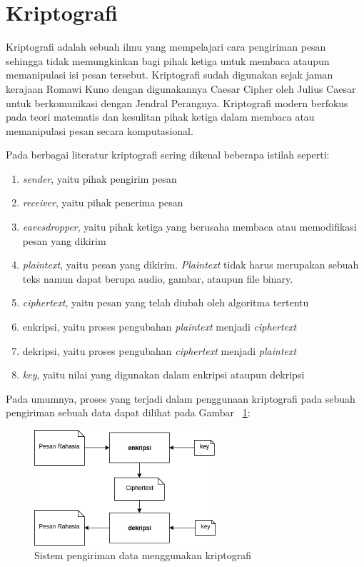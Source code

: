 \section{Kriptografi}
  Kriptografi adalah sebuah ilmu yang mempelajari cara pengiriman pesan sehingga tidak memungkinkan bagi pihak ketiga untuk membaca ataupun memanipulasi isi pesan tersebut. Kriptografi sudah digunakan sejak jaman kerajaan Romawi Kuno dengan digunakannya Caesar Cipher oleh Julius Caesar untuk berkomunikasi dengan Jendral Perangnya. Kriptografi modern berfokus pada teori matematis dan kesulitan pihak ketiga dalam membaca atau memanipulasi pesan secara komputasional.

  Pada berbagai literatur kriptografi sering dikenal beberapa istilah seperti:
  \begin{enumerate}[label=\roman*.]
    \item \textit{sender}, yaitu pihak pengirim pesan
    \item \textit{receiver}, yaitu pihak penerima pesan
    \item \textit{eavesdropper}, yaitu pihak ketiga yang berusaha membaca atau memodifikasi pesan yang dikirim
    \item \textit{plaintext}, yaitu pesan yang dikirim. \textit{Plaintext} tidak harus merupakan sebuah teks namun dapat berupa audio, gambar, ataupun file binary.
    \item \textit{ciphertext}, yaitu pesan yang telah diubah oleh algoritma tertentu
    \item enkripsi, yaitu proses pengubahan \textit{plaintext} menjadi \textit{ciphertext}
    \item dekripsi, yaitu proses pengubahan \textit{ciphertext} menjadi \textit{plaintext}
    \item \textit{key}, yaitu nilai yang digunakan dalam enkripsi ataupun dekripsi
  \end{enumerate}

  Pada umumnya, proses yang terjadi dalam penggunaan kriptografi pada sebuah pengiriman sebuah data dapat dilihat pada Gambar ~\ref{fig:krypto_system}:

  \begin{figure}[h]
    \centering
    \includegraphics[width=0.6\textwidth]{resources/ch-2/crypto-system.jpg}
    \caption{Sistem pengiriman data menggunakan kriptografi}
    \label{fig:krypto_system}
  \end{figure}


